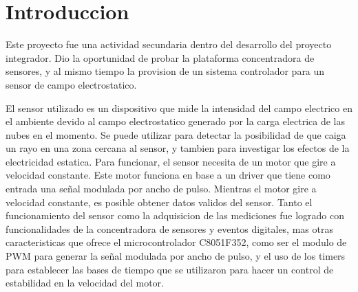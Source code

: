 \section{Introduccion} %
\label{sec:introduccion}

Este proyecto fue una actividad secundaria dentro del desarrollo del proyecto integrador. Dio la oportunidad de probar la plataforma concentradora de sensores, y al mismo tiempo la provision de un sistema controlador para un sensor de campo electrostatico. 

El sensor utilizado es un dispositivo que mide la intensidad del campo electrico en el ambiente devido al campo electrostatico generado por la carga electrica de las nubes en el momento. Se puede utilizar para detectar la posibilidad de que caiga un rayo en una zona cercana al sensor, y tambien para investigar los efectos de la electricidad estatica. Para funcionar, el sensor necesita de un motor que gire a velocidad constante. Este motor funciona en base a un driver que tiene como entrada una se\~nal modulada por ancho de pulso. Mientras el motor gire a velocidad constante, es posible obtener datos validos del sensor. Tanto el funcionamiento del sensor como la adquisicion de las mediciones fue logrado con funcionalidades de la concentradora de sensores y eventos digitales, mas otras caracteristicas que ofrece el microcontrolador C8051F352, como ser el modulo de PWM para generar la se\~nal modulada por ancho de pulso, y el uso de los timers para establecer las bases de tiempo que se utilizaron para hacer un control de estabilidad en la velocidad del motor.

